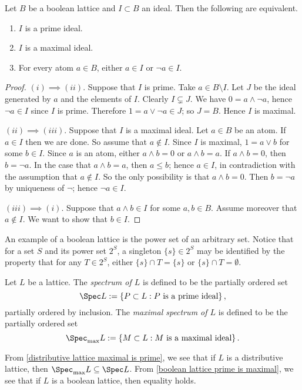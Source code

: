 \begin{proposition}
\label{boolean lattice prime is maximal}
Let $B$ be a boolean lattice and $I \subset B$ an ideal. Then the following are equivalent.
\begin{enumerate}[label=\romansmallnumbering]
	\item $I$ is a prime ideal.
	\item $I$ is a maximal ideal.
	\item For every atom $a \in B$, either $a \in I$ or $\neg a \in I$.
\end{enumerate}
\end{proposition}
\begin{proof}
$(i) \implies (ii)$. Suppose that $I$ is prime. Take $a \in B \setminus I$. Let $J$ be the ideal generated by $a$ and the elements of $I$. Clearly $I \subsetneq J$. We have $0 = a \wedge \neg a$, hence $\neg a \in I$ since $I$ is prime. Therefore $1 = a \vee \neg a \in J$; so $J = B$. Hence $I$ is maximal.

$(ii) \implies (iii)$. Suppose that $I$ is a maximal ideal. Let $a \in B$ be an atom. If $a \in I$ then we are done. So assume that $a \not\in I$. Since $I$ is maximal, $1 = a \vee b$ for some $b \in I$. Since $a$ is an atom, either $a \wedge b = 0$ or $a \wedge b = a$. If $a \wedge b = 0$, then $b = \neg a$. In the case that $a \wedge b = a$, then $a \leq b$; hence $a \in I$, in contradiction with the assumption that $a \not\in I$. So the only possibility is that $a \wedge b = 0$. Then $b = \neg a$ by uniqueness of $\neg$; hence $\neg a \in I$.

$(iii) \implies (i)$. Suppose that $a \wedge b \in I$ for some $a,b \in B$. Assume moreover that $a \not\in I$. We want to show that $b \in I$.


\end{proof}
An example of a boolean lattice is the power set of an arbitrary set. Notice that for a set $S$ and its power set $2^S$, a singleton $\{s\} \in 2^S$ may be identified by the property that for any $T \in 2^S$, either $\{s\} \cap T = \{s\}$ or $\{s\} \cap T = \emptyset$.


\begin{definition}
Let $L$ be a lattice. The \emph{spectrum of $L$} is defined to be the partially ordered set
\[ \Spec L := \left\{ P \subset L : P \text{ is a prime ideal} \right\}, \]
partially ordered by inclusion. The \emph{maximal spectrum of $L$} is defined to be the partially ordered set
\[ \Spec_{\max} L := \left\{ M \subset L : M \text{ is a maximal ideal} \right\}. \]
\end{definition}
From \cref{distributive lattice maximal is prime}, we see that if $L$ is a distributive lattice, then $\Spec_{\max} L \subseteq \Spec L$. From \cref{boolean lattice prime is maximal}, we see that if $L$ is a boolean lattice, then equality holds.

